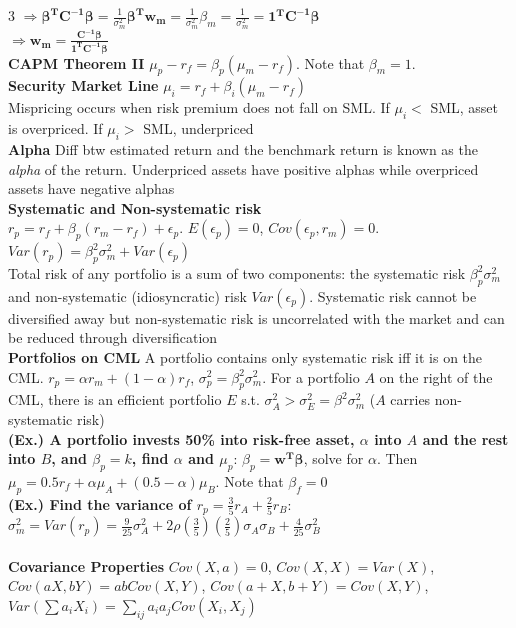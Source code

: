 \documentclass{article}
\begin{document}
{\begin{multicols*}{3}
$\Longrightarrow \boldsymbol{\beta^TC^{-1}\beta}=\frac{1}{\sigma_m^2}\boldsymbol{\beta^Tw_m}=\frac{1}{\sigma_m^2}\beta_m=\frac{1}{\sigma_m^2}=\boldsymbol{1^TC^{-1}\beta}$\\
$\Longrightarrow \boldsymbol{w_m}=\frac{\boldsymbol{C^{-1}\beta}}{\boldsymbol{1^TC^{-1}\beta}}$\\
\textbf{CAPM Theorem II} $\mu_p-r_f=\beta_p(\mu_{m}-r_f)$. Note that $\beta_m=1$. \\
\textbf{Security Market Line} $\mu_i=r_f+\beta_i(\mu_{m}-r_f)$\\
Mispricing occurs when risk premium does not fall on SML. If $\mu_i<$ SML, asset is overpriced. If $\mu_i>$ SML, underpriced\\
\textbf{Alpha} Diff btw estimated return and the benchmark return is known as the \textit{alpha} of the return. Underpriced assets have positive alphas while overpriced assets have negative alphas\\
\textbf{Systematic and Non-systematic risk} \\
$r_p=r_f+\beta_p(r_m-r_f)+\epsilon_p$. $E(\epsilon_p)=0$, $Cov(\epsilon_p,r_m)=0$. $Var(r_p)=\beta_p^2\sigma_m^2+Var(\epsilon_p)$\\
Total risk of any portfolio is a sum of two components: the systematic risk $\beta_p^2\sigma_m^2$ and non-systematic (idiosyncratic) risk $Var(\epsilon_p)$. Systematic risk cannot be diversified away but non-systematic risk is uncorrelated with the market and can be reduced through diversification \\
\textbf{Portfolios on CML} A portfolio contains only systematic risk iff it is on the CML. $r_p=\alpha r_m+(1-\alpha)r_f$, $\sigma_p^2=\beta_p^2\sigma_m^2$. For a portfolio $A$ on the right of the CML, there is an efficient portfolio $E$ s.t. $\sigma_A^2>\sigma_E^2=\beta^2\sigma_m^2$ ($A$ carries non-systematic risk)\\
\textbf{(Ex.) A portfolio invests 50\% into risk-free asset, $\alpha$ into $A$ and the rest into $B$, and $\beta_p=k$, find $\alpha$ and $\mu_p$}: $\beta_p=\boldsymbol{w^T\beta}$, solve for $\alpha$. Then $\mu_p=0.5r_f+\alpha\mu_A+(0.5-\alpha)\mu_B$. Note that $\beta_f=0$\\
\textbf{(Ex.) Find the variance of $r_p=\frac{3}{5}r_A+\frac{2}{5}r_B$}: $\sigma_m^2=Var(r_p)=\frac{9}{25}\sigma_A^2+2\rho(\frac{3}{5})(\frac{2}{5})\sigma_A\sigma_B+\frac{4}{25}\sigma_B^2$\\
\vspace{5pt}\\
\textbf{Covariance Properties} $Cov(X,a)=0$, $Cov(X,X)=Var(X)$, $Cov(aX,bY)=abCov(X,Y)$, $Cov(a+X,b+Y)=Cov(X,Y)$, $Var(\sum a_iX_i)=\sum_{ij} a_ia_jCov(X_i,X_j)$\\

\end{multicols*}}
\end{document}
